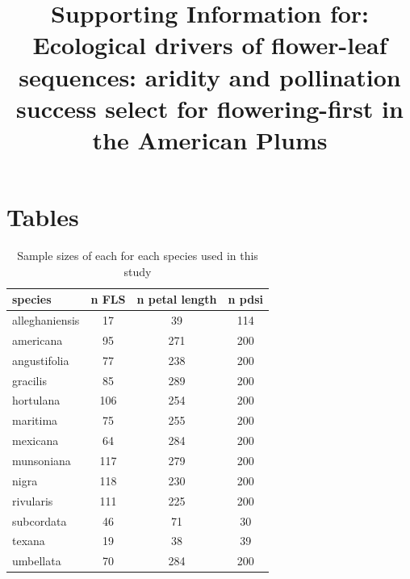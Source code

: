 \documentclass{article}[11pt]
\title{Supporting Information for: Ecological drivers of flower-leaf sequences: aridity and pollination success select for flowering-first in the American Plums}
\date{}
\begin{document}

\maketitle

\section*{Tables}
\begin{table}[ht]
\centering
\begin{tabular}{|lccc|}
  \hline
  species & n FLS & n petal length & n pdsi \\ 
  \hline
 alleghaniensis &  17 &  39 & 114 \\ 
americana &  95 & 271 & 200 \\ 
angustifolia &  77 & 238 & 200 \\ 
 gracilis &  85 & 289 & 200 \\ 
 hortulana & 106 & 254 & 200 \\ 
  maritima &  75 & 255 & 200 \\ 
  mexicana &  64 & 284 & 200 \\ 
  munsoniana & 117 & 279 & 200 \\ 
 nigra & 118 & 230 & 200 \\ 
   rivularis & 111 & 225 & 200 \\ 
   subcordata &  46 &  71 &  30 \\ 
   texana &  19 &  38 &  39 \\ 
  umbellata &  70 & 284 & 200 \\ 
   \hline
\end{tabular}
\caption{Sample sizes of each for each species used in this study}
\label{tab:samps}
\end{table}
\end{document}
